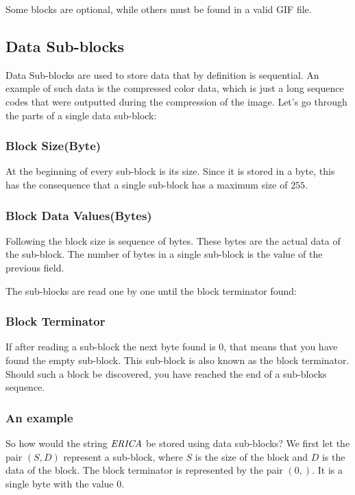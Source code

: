 Some blocks are optional, while others must be found in a valid GIF
file.

\subsection{Data Sub-blocks}
\label{sec:gif-data-sub-blocks}

Data Sub-blocks are used to store data that by definition is
sequential. An example of such data is the compressed color data,
which is just a long sequence codes that were outputted during the
compression of the image. Let's go through the parts of a single data
sub-block:

\subsubsection*{Block Size(Byte)}

At the beginning of every sub-block is its size. Since it is stored in
a byte, this has the consequence that a single sub-block has a maximum
size of $255$.

\subsubsection*{Block Data Values(Bytes)}

Following the block size is sequence of bytes. These bytes are the
actual data of the sub-block. The number of bytes in a single
sub-block is the value of the previous field.

The sub-blocks are read one by one until the block terminator found:

\subsubsection{Block Terminator}

If after reading a sub-block the next byte found is 0, that means
that you have found the empty sub-block. This sub-block is also
known as the block terminator. Should such a block be discovered, you
have reached the end of a sub-blocks sequence.

\subsubsection{An example}

So how would the string $\mathit{ERICA}$ be stored using data sub-blocks? We
first let the pair $(S,D)$ represent a sub-block, where $S$ is the
size of the block and $D$ is the data of the block. The block
terminator is represented by the pair $(0,)$. It is a single byte with
the value $0$.


